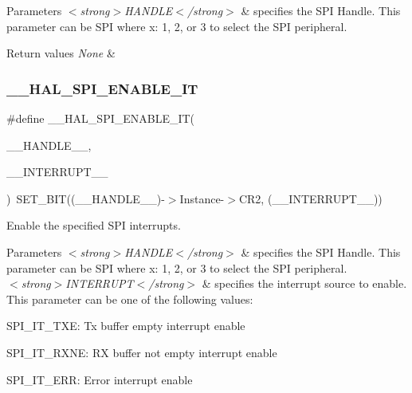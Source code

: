 \begin{DoxyParams}{Parameters}
{\em $<$strong$>$\+H\+A\+N\+D\+L\+E$<$/strong$>$} & specifies the S\+PI Handle. This parameter can be S\+PI where x\+: 1, 2, or 3 to select the S\+PI peripheral. \\
\hline
\end{DoxyParams}

\begin{DoxyRetVals}{Return values}
{\em None} & \\
\hline
\end{DoxyRetVals}
\mbox{\label{group___s_p_i___exported___macros_ga76064652f6f56d8868720b5541e854f5}} 
\subsubsection{\texorpdfstring{\_\_HAL\_SPI\_ENABLE\_IT}{\_\_HAL\_SPI\_ENABLE\_IT}}
{\footnotesize\ttfamily \#define \+\_\+\+\_\+\+H\+A\+L\+\_\+\+S\+P\+I\+\_\+\+E\+N\+A\+B\+L\+E\+\_\+\+IT(\begin{DoxyParamCaption}\item[{}]{\+\_\+\+\_\+\+H\+A\+N\+D\+L\+E\+\_\+\+\_\+,  }\item[{}]{\+\_\+\+\_\+\+I\+N\+T\+E\+R\+R\+U\+P\+T\+\_\+\+\_\+ }\end{DoxyParamCaption})~S\+E\+T\+\_\+\+B\+IT((\+\_\+\+\_\+\+H\+A\+N\+D\+L\+E\+\_\+\+\_\+)-\/$>$Instance-\/$>$C\+R2, (\+\_\+\+\_\+\+I\+N\+T\+E\+R\+R\+U\+P\+T\+\_\+\+\_\+))}



Enable the specified S\+PI interrupts. 


\begin{DoxyParams}{Parameters}
{\em $<$strong$>$\+H\+A\+N\+D\+L\+E$<$/strong$>$} & specifies the S\+PI Handle. This parameter can be S\+PI where x\+: 1, 2, or 3 to select the S\+PI peripheral. \\
\hline
{\em $<$strong$>$\+I\+N\+T\+E\+R\+R\+U\+P\+T$<$/strong$>$} & specifies the interrupt source to enable. This parameter can be one of the following values\+: \begin{DoxyItemize}
\item S\+P\+I\+\_\+\+I\+T\+\_\+\+T\+XE\+: Tx buffer empty interrupt enable \item S\+P\+I\+\_\+\+I\+T\+\_\+\+R\+X\+NE\+: RX buffer not empty interrupt enable \item S\+P\+I\+\_\+\+I\+T\+\_\+\+E\+RR\+: Error interrupt enable \end{DoxyItemize}
\\
\hline
\end{DoxyParams}

